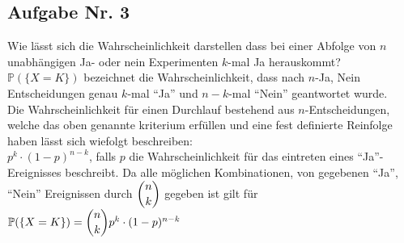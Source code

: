 \subsection{Aufgabe Nr. 3}
Wie lässt sich die Wahrscheinlichkeit darstellen dass bei einer Abfolge von $n$ unabhängigen Ja- oder nein Experimenten $k$-mal Ja herauskommt?\\
$\mathbb{P}(\{X=K\})$ bezeichnet die Wahrscheinlichkeit, dass nach $n$-Ja, Nein Entscheidungen genau $k$-mal "`Ja"' und $n-k$-mal "`Nein"' geantwortet wurde.\\
Die Wahrscheinlichkeit für einen Durchlauf bestehend aus $n$-Entscheidungen, welche das oben genannte kriterium erfüllen und eine fest definierte Reinfolge haben lässt sich wiefolgt beschreiben:\\
$p^k\cdot (1-p)^{n-k}$, falls $p$ die Wahrscheinlichkeit für das eintreten eines "`Ja"'- Ereignisses beschreibt. Da alle möglichen Kombinationen, von gegebenen "`Ja"', "`Nein"' Ereignissen durch $\dbinom{n}{k}$ gegeben ist gilt für $\mathbb{P}(\{X=K\})=\dbinom{n}{k}p^k\cdot (1-p)^{n-k}$
